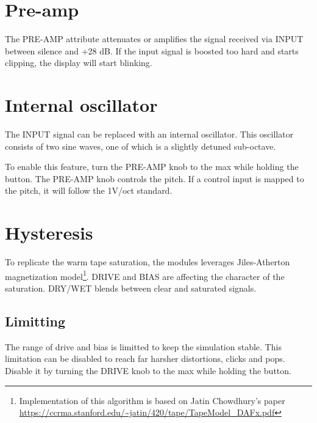 \documentclass[11pt]{article}
\begin{document}
\newpage

\begin{minipage}[t]{0.45\textwidth}
\setlength{\parskip}{6pt}
\section{Pre-amp}

The PRE-AMP attribute attenuates or amplifies the signal received via INPUT
between silence and +28 dB. If the input signal is boosted too hard and starts
clipping, the display will start blinking.

\vspace{1cm}

\section{Internal oscillator}

The INPUT signal can be replaced with an internal oscillator. This oscillator
consists of two sine waves, one of which is a slightly detuned sub-octave.

To enable this feature, turn the PRE-AMP knob to the max while holding the
button. The PRE-AMP knob controls the pitch. If a control input is mapped to the
pitch, it will follow the 1V/oct standard.

\vspace{1cm}

\section{Hysteresis}

To replicate the warm tape saturation, the modules leverages Jiles-Atherton
magnetization model\footnote{
  Implementation of this algorithm is based on Jatin Chowdhury's paper
  \url{https://ccrma.stanford.edu/~jatin/420/tape/TapeModel_DAFx.pdf}
}. DRIVE and BIAS are affecting the character of the saturation. DRY/WET blends
between clear and saturated signals.

\subsection{Limitting}

The range of drive and bias is limitted to keep the simulation stable. This
limitation can be disabled to reach far harsher distortions, clicks and pops.
Disable it by turning the DRIVE knob to the max while holding the button.

\vspace{1cm}

\end{minipage}%
\end{document}

